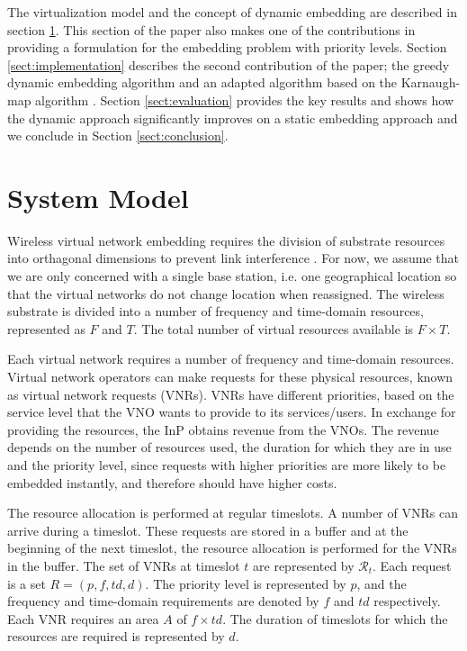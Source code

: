 \documentclass[conference]{IEEEtran}
\begin{document}
The virtualization model and the concept of dynamic embedding are described in section \ref{sect:model}. This section of the paper also makes one of the contributions in providing a formulation for the embedding problem with priority levels. Section \ref{sect:implementation} describes the second contribution of the paper; the greedy dynamic embedding algorithm and an adapted algorithm based on the Karnaugh-map algorithm \cite{Yang2012}. Section \ref{sect:evaluation} provides the key results and shows how the dynamic approach significantly improves on a static embedding approach and we conclude in Section \ref{sect:conclusion}.



\section{System Model}
\label{sect:model}



Wireless virtual network embedding requires the division of substrate resources into orthagonal dimensions to prevent link interference \cite{Park2009}. For now, we assume that we are only concerned with a single base station, i.e. one geographical location so that the virtual networks do not change location when reassigned. The wireless substrate is divided into a number of frequency and time-domain resources, represented as $F$ and $T$. The total number of virtual resources available is $F \times T$.

Each virtual network requires a number of frequency and time-domain resources. Virtual network operators can make requests for these physical resources, known as virtual network requests (VNRs). VNRs have different priorities, based on the service level that the VNO wants to provide to its services/users. In exchange for providing the resources, the InP obtains revenue from the VNOs. The revenue depends on the number of resources used, the duration for which they are in use and the priority level, since requests with higher priorities are more likely to be embedded instantly, and therefore should have higher costs.

The resource allocation is performed at regular timeslots. A number of VNRs can arrive during a timeslot. These requests are stored in a buffer and at the beginning of the next timeslot, the resource allocation is performed for the VNRs in the buffer. The set of VNRs at timeslot $t$ are represented by $\mathcal{R}_t$. Each request is a set $R = (p, f, td, d)$. The priority level is represented by $p$, and the frequency and time-domain requirements are denoted by $f$ and $td$ respectively. Each VNR requires an area $A$ of $f \times td$. The duration of timeslots for which the resources are required is represented by $d$.
\end{document}
